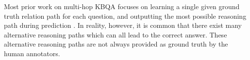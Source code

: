 Most prior work on multi-hop KBQA focuses on learning a single given ground truth relation path for each question, and outputting the most possible reasoning path during prediction \cite{DBLP:conf/coling/ZhouHZ18,DBLP:journals/corr/abs-1801-09893,DBLP:conf/adbis/YuHYZW18,DBLP:conf/ijcai/LanW019}. In reality, however, it is common that there exist many alternative reasoning paths which can all lead to the correct answer. These alternative reasoning paths are not always provided as ground truth by the human annotators. %
